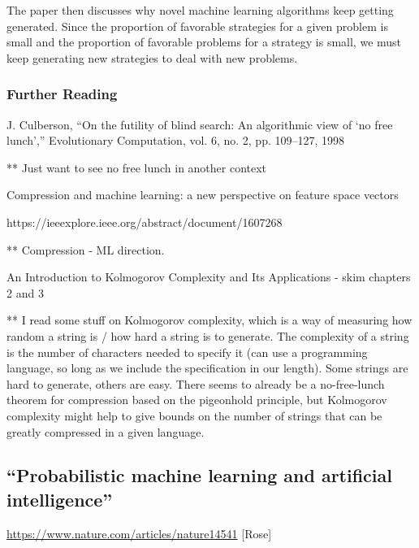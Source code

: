 \documentclass[12pt]{article}
\begin{document}
\bigskip

The paper then discusses why novel machine learning algorithms keep getting generated. Since the proportion of favorable strategies for a given problem is small and the proportion of favorable problems for a strategy is small, we must keep generating new strategies to deal with new problems.  

\subsubsection*{Further Reading} 

J. Culberson, “On the futility of blind search: An algorithmic view of
‘no free lunch’,” Evolutionary Computation, vol. 6, no. 2, pp. 109–127,
1998

** Just want to see no free lunch in another context

\bigskip

Compression and machine learning: a new perspective on feature space vectors

https://ieeexplore.ieee.org/abstract/document/1607268

** Compression - ML direction. 


\bigskip

An Introduction to Kolmogorov Complexity and Its Applications - skim chapters 2 and 3

** I read some stuff on Kolmogorov complexity, which is a way of measuring how random a string is / how hard a string is to generate. The complexity of a string is the number of characters needed to specify it (can use a programming language, so long as we include the specification in our length). Some strings are hard to generate, others are easy. There seems to already be a no-free-lunch theorem for compression based on the pigeonhold principle, but Kolmogorov complexity might help to give bounds on the number of strings that can be greatly compressed in a given language. 

\newpage

\subsection*{“Probabilistic machine learning and artificial intelligence”}
\url{https://www.nature.com/articles/nature14541} [Rose]
\end{document}
